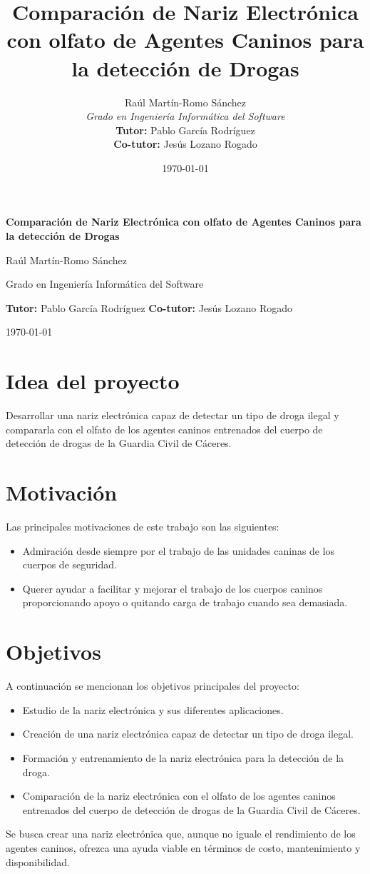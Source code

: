 \documentclass[12pt,a4paper,oneside]{report}
\title{Comparación de Nariz Electrónica con olfato de Agentes Caninos para la detección de Drogas}
\author{Raúl Martín-Romo Sánchez\\
	\textit{Grado en Ingeniería Informática del Software}\\
	\textbf{Tutor:} Pablo García Rodríguez\\
    \textbf{Co-tutor:} Jesús Lozano Rogado}
\date{\today}
\begin{document}
\begingroup
\begin{center}
	{\LARGE \textbf{Comparación de Nariz Electrónica con olfato de Agentes Caninos para la detección de Drogas}\par}
	\vspace{1em}
	{\large Raúl Martín-Romo Sánchez\par}
	{\small Grado en Ingeniería Informática del Software\par}
	\vspace{0.5em}
	{\small \textbf{Tutor:} Pablo García Rodríguez \quad \textbf{Co-tutor:} Jesús Lozano Rogado\par}
	\vspace{1em}
	{\small \today\par}
\end{center}
\bigskip
\endgroup

\section{Idea del proyecto}
Desarrollar una nariz electrónica capaz de detectar un tipo de droga ilegal y compararla con el olfato de los agentes caninos entrenados del cuerpo de detección de drogas de la Guardia Civil de Cáceres.

\section{Motivación}
Las principales motivaciones de este trabajo son las siguientes:
\begin{itemize}
	\item Admiración desde siempre por el trabajo de las unidades caninas de los cuerpos de seguridad.
	\item Querer ayudar a facilitar y mejorar el trabajo de los cuerpos caninos proporcionando apoyo o quitando carga de trabajo cuando sea demasiada.
\end{itemize}

\section{Objetivos}
A continuación se mencionan los objetivos principales del proyecto:
\begin{itemize}
	\item Estudio de la nariz electrónica y sus diferentes aplicaciones.
	\item Creación de una nariz electrónica capaz de detectar un tipo de droga ilegal.
	\item Formación y entrenamiento de la nariz electrónica para la detección de la droga.
	\item Comparación de la nariz electrónica con el olfato de los agentes caninos entrenados del cuerpo de detección de drogas de la Guardia Civil de Cáceres.
\end{itemize}
Se busca crear una nariz electrónica que, aunque no iguale el rendimiento de los agentes caninos, ofrezca una ayuda viable en términos de costo, mantenimiento y disponibilidad.
\end{document}
